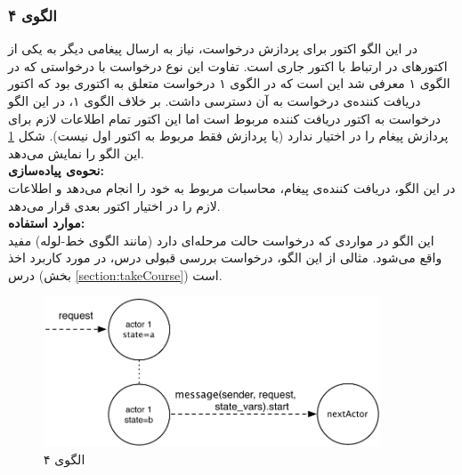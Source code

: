 \subsubsection{الگوی ۴}
در این الگو اکتور برای پردازش درخواست، نیاز به ارسال پیغامی دیگر به یکی از اکتورهای در ارتباط با اکتور جاری است. تفاوت این نوع درخواست با درخواستی که در الگوی ۱ معرفی شد این است که در الگوی ۱ درخواست متعلق به اکتوری بود که اکتور دریافت کننده‌ی درخواست به آن دسترسی داشت. بر خلاف الگوی ۱، در این الگو درخواست به اکتور دریافت کننده مربوط است اما این اکتور تمام اطلاعات لازم برای پردازش پیغام را در اختیار ندارد (یا پردازش فقط مربوط به اکتور اول نیست). شکل \ref{fig:Patterns_stateless_4} این الگو را نمایش می‌دهد.\\
\textbf{نحوه‌ی پیاده‌سازی:}\\
 در این الگو، دریافت کننده‌ی پیغام، محاسبات مربوط به خود را انجام می‌دهد و اطلاعات لازم را در اختیار اکتور بعدی قرار می‌دهد. \\
 \textbf{موارد استفاده:}\\
این الگو در مواردی که درخواست حالت مرحله‌ای دارد (مانند الگوی خط-لوله) مفید واقع می‌شود. مثالی از این الگو، درخواست بررسی قبولی درس، در مورد کاربرد اخذ درس (بخش \ref{section:takeCourse}) است.
\begin{figure}[hb]
    \begin{center}
	\includegraphics[width=10cm]{4-ProposedFramework/Figures/Patterns_stateless_4.pdf}
    \end{center}
    \caption{\label{fig:Patterns_stateless_4}الگوی ۴}
\end{figure}

